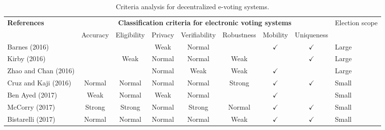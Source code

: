 \documentclass[../access.tex]{subfiles}
\begin{document}
        \begin{table}[htbp]
            \caption{Criteria analysis for decentralized e-voting systems.}
            \begin{adjustwidth}{-1cm}{}
                \begin{tabular}{m{4.4cm} c c c c c c c >{\centering\arraybackslash}m{0.7cm}} %
                    \toprule
                    \multirow{3.5}{=}{\textbf{\footnotesize{References}}} & \multicolumn{7}{c}{\textbf{\footnotesize{Classification criteria for electronic voting systems}}} & \multirow{3.5}{=}{\footnotesize{Election scope}} \\
                    \cline{2-8}
                    \vspace{0.5cm}
                    \multirow{2}{=}{} & \footnotesize{Accuracy} & \footnotesize{Eligibility} & \footnotesize{Privacy} & \footnotesize{Verifiability} & \footnotesize{Robustness} & \footnotesize{Mobility} & \footnotesize{Uniqueness} & \multirow{2}{=}{} \\
                    \hline
                    \footnotesize{Barnes (2016) \cite{Barnes2016}} & {} & {} & {Weak} & {Normal} & {} & $ \checkmark $ & $ \checkmark $ & \footnotesize{Large} \\
                    \hline
                    \footnotesize{Kirby (2016) \cite{Kirby2016}} & {} & {Weak} & {Normal} & {Normal} & {Weak} & {} & $ \checkmark $ & \footnotesize{Large} \\
                    \hline
                    \footnotesize{Zhao and Chan (2016) \cite{Zhao2016}} & {} & {} & {Normal} & {Weak} & {Weak} & $ \checkmark $ & {} & \footnotesize{Large} \\
                    \hline
                    \footnotesize{Cruz and Kaji (2016) \cite{Cruz2016}} & {Normal} & {Normal} & {Normal} & {Normal} & {Strong} & $ \checkmark $ & $ \checkmark $ & \footnotesize{Small} \\
                    \hline
                    \footnotesize{Ben Ayed (2017) \cite{BenAyed2017}} & {Weak} & {Normal} & {Weak} & {Normal} & {} & $ \checkmark $ & {} & \footnotesize{Small} \\
                    \hline
                    \footnotesize{McCorry (2017) \cite{McCorry2017}} & {Strong} & {Strong} & {Normal} & {Strong} & {Normal} & $ \checkmark $ & $ \checkmark $ & \footnotesize{Small} \\
                    \hline
                    \footnotesize{Bistarelli (2017) \cite{Bistarelli2017}} & {Normal} & {Normal} & {Normal} & {Normal} & {Weak} & $ \checkmark $ & $ \checkmark $ & \footnotesize{Small} \\

\end{tabular}
\end{adjustwidth}
\end{table}
\end{document}
